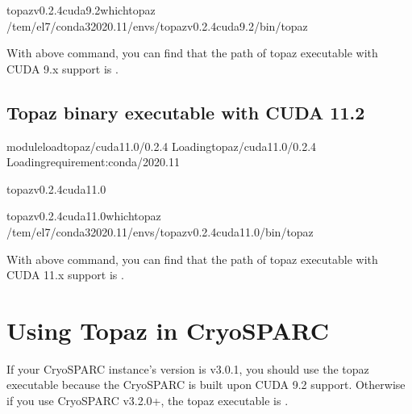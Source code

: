 \documentclass[a4paper,11pt,english]{sphinxmanual}
\begin{document}
\begin{sphinxVerbatim}[commandchars=\\\{\}]
topaz\PYGZhy{}v0.2.4\PYGZhy{}cuda9.2\PYGZdl{}\PYGZgt{}whichtopaz
/tem/el7/conda3\PYGZhy{}2020.11/envs/topaz\PYGZhy{}v0.2.4\PYGZhy{}cuda9.2/bin/topaz
\end{sphinxVerbatim}

\sphinxAtStartPar
With above command, you can find that the path of topaz executable with CUDA 9.x support is .


\subsection{Topaz binary executable with CUDA 11.2}
\label{\detokenize{topaz:topaz-binary-executable-with-cuda-11-2}}
\begin{sphinxVerbatim}[commandchars=\\\{\}]
\PYGZdl{}\PYGZgt{}moduleloadtopaz/cuda\PYGZhy{}11.0/0.2.4
Loadingtopaz/cuda\PYGZhy{}11.0/0.2.4
Loadingrequirement:conda/2020.11

topaz\PYGZhy{}v0.2.4\PYGZhy{}cuda11.0\PYGZdl{}\PYGZgt{}
\end{sphinxVerbatim}

\begin{sphinxVerbatim}[commandchars=\\\{\}]
topaz\PYGZhy{}v0.2.4\PYGZhy{}cuda11.0\PYGZdl{}\PYGZgt{}whichtopaz
/tem/el7/conda3\PYGZhy{}2020.11/envs/topaz\PYGZhy{}v0.2.4\PYGZhy{}cuda11.0/bin/topaz
\end{sphinxVerbatim}

\sphinxAtStartPar
With above command, you can find that the path of topaz executable with CUDA 11.x support is .


\section{Using Topaz in CryoSPARC}
\label{\detokenize{topaz:using-topaz-in-cryosparc}}
\sphinxAtStartPar
If your CryoSPARC instance’s version is v3.0.1, you should use the topaz executable  because the CryoSPARC is built upon CUDA 9.2 support.
Otherwise if you use CryoSPARC v3.2.0+, the topaz executable is .
\end{document}
